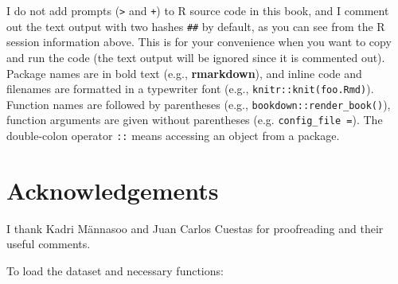 \documentclass[]{book}
\begin{document}
I do not add prompts (\texttt{\textgreater{}} and \texttt{+}) to R
source code in this book, and I comment out the text output with two
hashes \texttt{\#\#} by default, as you can see from the R session
information above. This is for your convenience when you want to copy
and run the code (the text output will be ignored since it is commented
out). Package names are in bold text (e.g., \textbf{rmarkdown}), and
inline code and filenames are formatted in a typewriter font (e.g.,
\texttt{knitr::knit(\textquotesingle{}foo.Rmd\textquotesingle{})}).
Function names are followed by parentheses (e.g.,
\texttt{bookdown::render\_book()}), function arguments are given without
parentheses (e.g. \texttt{config\_file\ =}). The double-colon operator
\texttt{::} means accessing an object from a package.

\hypertarget{acknowledgements}{%
\section*{Acknowledgements}\label{acknowledgements}}

I thank Kadri Männasoo and Juan Carlos Cuestas for proofreading and
their useful comments.

To load the dataset and necessary functions:
\end{document}
